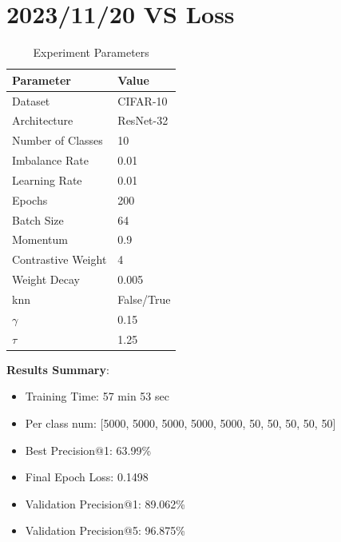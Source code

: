 \documentclass{article}
\begin{document}
\section{2023/11/20 VS Loss}
\begin{table}[h!]
\centering
\caption{Experiment Parameters}
\label{tab:parameters_vs}
\begin{tabular}{ll}
\toprule
Parameter & Value \\
\midrule
Dataset & CIFAR-10 \\
Architecture & ResNet-32 \\
Number of Classes & 10 \\
Imbalance Rate & 0.01 \\
Learning Rate & 0.01 \\
Epochs & 200 \\
Batch Size & 64 \\
Momentum & 0.9 \\
Contrastive Weight & 4\\
Weight Decay & 0.005 \\
knn & False/True \\
\(\gamma\) & 0.15 \\
\(\tau\) & 1.25 \\
\bottomrule
\end{tabular}
\end{table}

\textbf{Results Summary}:
\begin{itemize}
    \item Training Time: 57 min 53 sec
    \item Per class num: [5000, 5000, 5000, 5000, 5000, 50, 50, 50, 50, 50]
    \item Best Precision@1: 63.99\%
    \item Final Epoch Loss: 0.1498
    \item Validation Precision@1: 89.062\%
    \item Validation Precision@5: 96.875\%
\end{itemize}
\end{document}
